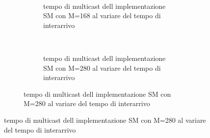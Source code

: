 \documentclass[a4paper]{article}
\begin{document}
\begin{figure}[!h]
\begin{subfigure}[b]{.5\columnwidth}
    ~
    \begin{subfigure}[b]{\textwidth}
      \centering
      \addtocounter{subfigure}{-1}
      \renewcommand\thesubfigure{\alph{subfigure}2}
      \resizebox{\columnwidth}{!}{}
      \caption{tempo di multicast dell implementazione SM con M=168 al variare del tempo di interarrivo}
      \label{fig:scalability_SM_size168}
    \end{subfigure}
    ~
    \begin{subfigure}[b]{\textwidth}
      \centering
      \addtocounter{subfigure}{-1}
      \renewcommand\thesubfigure{\alph{subfigure}3}
      \resizebox{\columnwidth}{!}{}
      \caption{tempo di multicast dell implementazione SM con M=280 al variare del tempo di interarrivo}
      \label{fig:scalability_SM_size280}
    \end{subfigure}
    \label{fig:allscalability_SM}
  \end{subfigure}
\end{figure}
\end{document}
